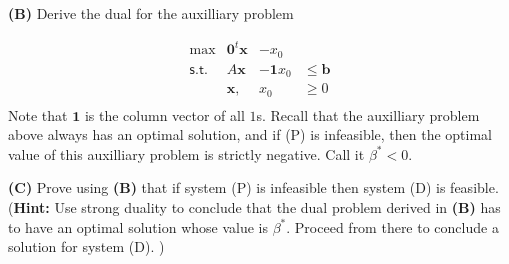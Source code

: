 \documentclass[11pt]{article}
\begin{document}
\medskip

\noindent\textbf{(B)} Derive the dual for the auxilliary problem 

\[ \begin{array}{rlll}
\max & \mathbf{0}^t \mathbf{x}  &- x_0 \\
\mathsf{s.t.} & A \mathbf{x} &  - \mathbf{1} x_0 & \leq \mathbf{b} \\
& \mathbf{x},  & x_0 & \geq 0 \\
\end{array}\]
Note that $\mathbf{1}$ is the column vector of all $1$s.
Recall that the auxilliary problem above always has an optimal
solution, and if \textsf{(P)} is infeasible, then the optimal value of this
auxilliary problem is strictly negative. Call it $\beta^* < 0$. 

\medskip

\noindent\textbf{(C)} Prove using \textbf{(B)}  that if system 
\textsf{(P)} is infeasible then system \textsf{(D)} is feasible. (\textbf{Hint:} Use
strong duality to conclude that the dual problem derived in 
\textbf{(B)} has to have an optimal solution whose value
is $\beta^*$. Proceed from there to conclude a solution for system 
(D). )
\end{document}
